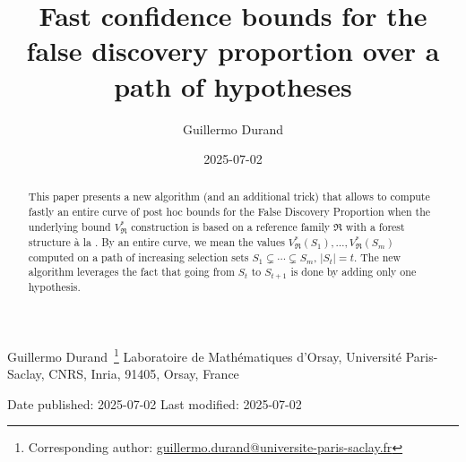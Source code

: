\documentclass[
  11pt,
  a4paper,
]{article}
\title{Fast confidence bounds for the false discovery proportion over a
path of hypotheses}
\author{Guillermo Durand}
\date{2025-07-02}
\theoremstyle{definition}
\theoremstyle{plain}
\theoremstyle{plain}
\theoremstyle{plain}
\theoremstyle{definition}
\theoremstyle{remark}
\begin{document}


\vspace*{2.5cm}
\begin{center}
          Guillermo
Durand~\footnote{Corresponding author: \href{mailto:guillermo.durand@universite-paris-saclay.fr}{guillermo.durand@universite-paris-saclay.fr}}\quad
             Laboratoire de Mathématiques d'Orsay, Université
Paris-Saclay, CNRS, Inria, 91405, Orsay, France\\
           
  \bigskip
  
  Date published: 2025-07-02 \quad Last modified: 2025-07-02
\end{center}
      
\bigskip
\begin{abstract}
This paper presents a new algorithm (and an additional trick) that
allows to compute fastly an entire curve of post hoc bounds for the
False Discovery Proportion when the underlying bound
\(V^*_{\mathfrak{R}}\) construction is based on a reference family
\(\mathfrak{R}\) with a forest structure à la \citet{MR4178188}. By an
entire curve, we mean the values
\(V^*_{\mathfrak{R}}(S_1),\dotsc,V^*_{\mathfrak{R}}(S_m)\) computed on a
path of increasing selection sets \(S_1\subsetneq\dotsb\subsetneq S_m\),
\(|S_t|=t\). The new algorithm leverages the fact that going from
\(S_t\) to \(S_{t+1}\) is done by adding only one hypothesis.
\end{abstract}
\end{document}
